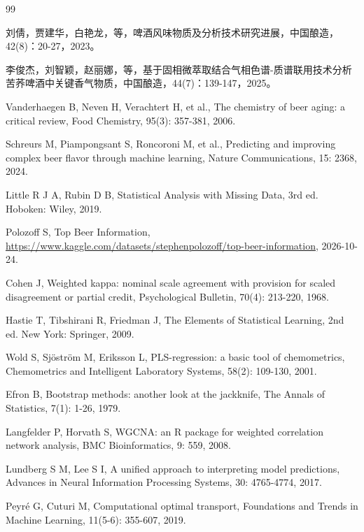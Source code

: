 ﻿\documentclass[UTF8,a4paper,zihao=-4]{ctexart}
\numberwithin{figure}{section}
\numberwithin{table}{section}
\numberwithin{equation}{section}
\begin{document}
\begin{thebibliography}{99}
\raggedright

刘倩，贾建华，白艳龙，等，啤酒风味物质及分析技术研究进展，中国酿造，42(8)：20-27，2023。

李俊杰，刘智颖，赵丽娜，等，基于固相微萃取结合气相色谱-质谱联用技术分析苦荞啤酒中关键香气物质，中国酿造，44(7)：139-147，2025。

Vanderhaegen B, Neven H, Verachtert H, et al., The chemistry of beer aging: a critical review, Food Chemistry, 95(3): 357-381, 2006.

Schreurs M, Piampongsant S, Roncoroni M, et al., 
Predicting and improving complex beer flavor through machine learning, Nature Communications, 
15: 2368, 2024.

Little R J A, Rubin D B, Statistical Analysis with Missing Data, 3rd ed. Hoboken: Wiley, 2019.

Polozoff S, Top Beer Information, \url{https://www.kaggle.com/datasets/stephenpolozoff/top-beer-information}, 2026-10-24.

Cohen J, Weighted kappa: nominal scale agreement with provision for scaled disagreement or partial credit, Psychological Bulletin, 70(4): 213-220, 1968.

Hastie T, Tibshirani R, Friedman J, The Elements of Statistical Learning, 2nd ed. New York: Springer, 2009.

Wold S, Sj\"ostr\"om M, Eriksson L, PLS-regression: a basic tool of chemometrics, Chemometrics and Intelligent Laboratory Systems, 58(2): 109-130, 2001.

Efron B, Bootstrap methods: another look at the jackknife, The Annals of Statistics, 7(1): 1-26, 1979.

Langfelder P, Horvath S, WGCNA: an R package for weighted correlation network analysis, BMC Bioinformatics, 9: 559, 2008.

Lundberg S M, Lee S I, A unified approach to interpreting model predictions, Advances in Neural Information Processing Systems, 30: 4765-4774, 2017.

Peyr\'e G, Cuturi M, Computational optimal transport, Foundations and Trends in Machine Learning, 11(5-6): 355-607, 2019.

\end{thebibliography}
\end{document}
